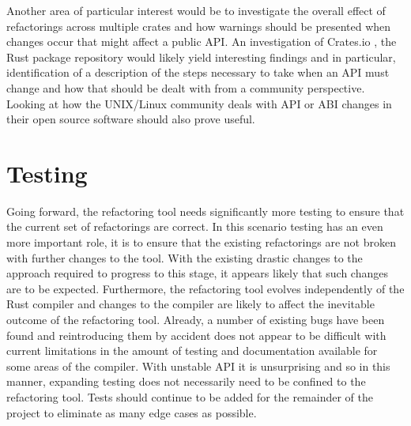 

Another area of particular interest would be to investigate the overall effect of refactorings across multiple crates and how warnings should be presented when changes occur that might affect a public API. An investigation of Crates.io \cite{cratesio15}, the Rust package repository would likely yield interesting findings and in particular, identification of a description of the steps necessary to take when an API must change and how that should be dealt with from a community perspective. Looking at how the UNIX/Linux community deals with API or ABI changes in their open source software should also prove useful.

\section{Testing}
Going forward, the refactoring tool needs significantly more testing to ensure that the current set of refactorings are correct. In this scenario testing has an even more important role, it is to ensure that the existing refactorings are not broken with further changes to the tool. With the existing drastic changes to the approach required to progress to this stage, it appears likely that such changes are to be expected. Furthermore, the refactoring tool evolves independently of the Rust compiler and changes to the compiler are likely to affect the inevitable outcome of the refactoring tool. Already, a number of existing bugs have been found and reintroducing them by accident does not appear to be difficult with current limitations in the amount of testing and documentation available for some areas of the compiler. With unstable API it is unsurprising and so in this manner, expanding testing does not necessarily need to be confined to the refactoring tool. Tests should continue to be added for the remainder of the project to eliminate as many edge cases as possible.

